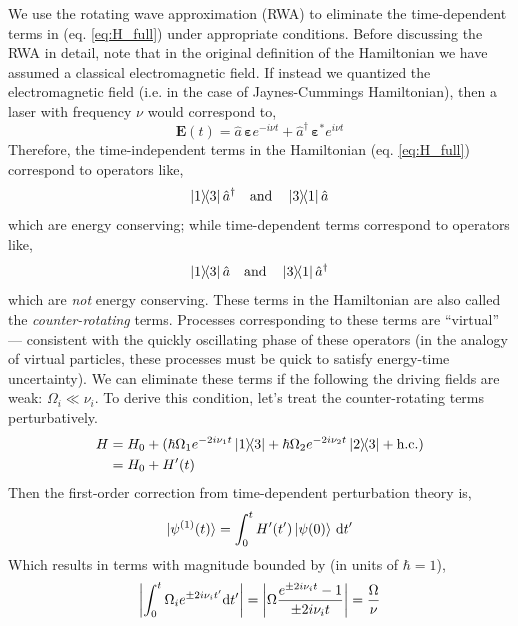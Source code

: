 \documentclass[10pt]{article}
\begin{document}
We use the rotating wave approximation (RWA) to eliminate the time-dependent terms in (eq. \ref{eq:H_full}) under appropriate conditions. Before discussing the RWA in detail, note that in the original definition of the Hamiltonian we have assumed a classical electromagnetic field. If instead we quantized the electromagnetic field (i.e. in the case of Jaynes-Cummings Hamiltonian), then a laser with frequency $\nu$ would correspond to,
\begin{equation}
    \boldsymbol{E}(t) = \hat{a}\,\boldsymbol{\varepsilon}e^{-i\nu t} + \hat{a}^\dagger\,\boldsymbol{\varepsilon}^*e^{i\nu t}
\end{equation}
Therefore, the time-independent terms in the Hamiltonian (eq. \ref{eq:H_full}) correspond to operators like,
\begin{equation}
    \ketbra{1}{3}\hat{a}^\dagger\quad \text{and}\quad\ketbra{3}{1}\hat{a}
\end{equation}
which are energy conserving; while time-dependent terms correspond to operators like,
\begin{equation}
    \ketbra{1}{3}\hat{a} \quad \text{and} \quad \ketbra{3}{1}\hat{a}^\dagger
\end{equation}
which are \textit{not} energy conserving. These terms in the Hamiltonian are also called the \textit{counter-rotating} terms. Processes corresponding to these terms are ``virtual'' --- consistent with the quickly oscillating phase of these operators (in the analogy of virtual particles, these processes must be quick to satisfy energy-time uncertainty). We can eliminate these terms if the following the driving fields are weak: $\Omega_i\ll\nu_i$. To derive this condition, let's treat the counter-rotating terms perturbatively.
\begin{align}
    H &= H_0 + (\hbar\Omega_1 e^{-2i\nu_1t}\ketbra{1}{3} + \hbar\Omega_2 e^{-2i\nu_2t}\ketbra{2}{3} + \text{h.c.}) \\
    &= H_0 + H'(t)
\end{align}
Then the first-order correction from time-dependent perturbation theory is,
\begin{equation}
    |\psi^{(1)}(t)\rangle = \int_0^t H'(t')\ket{\psi(0)}\,\dd t'
\end{equation}
Which results in terms with magnitude bounded by (in units of $\hbar=1$),
\begin{equation}
    \abs{\int_0^t \Omega_i e^{\pm 2i\nu_i t'}\dd t'} = \abs{\Omega\frac{e^{\pm 2i\nu_i t}-1}{\pm 2i\nu_i t}} = \frac{\Omega}{\nu}
\end{equation}
\end{document}
